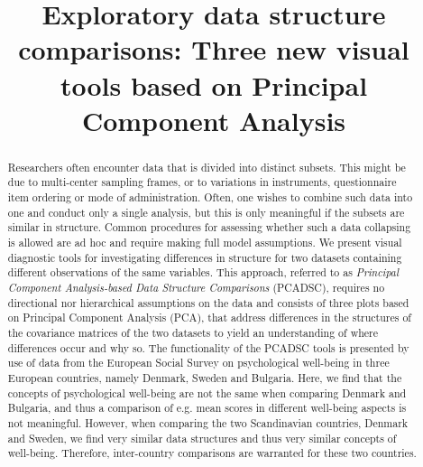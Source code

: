 \documentclass[a4paper,14pt]{article}
\begin{document}

\title{Exploratory data structure comparisons: Three new visual tools based on Principal Component Analysis}

\author[1]{}

\maketitle


\newpage

\renewcommand{\abstractname}{Abstract}
\renewcommand{\figurename}{Figure}
\renewcommand{\tablename}{Table}

\begin{abstract}
Researchers often encounter data that is divided into distinct subsets. This might be due to multi-center sampling frames, or to variations in instruments, questionnaire item ordering or mode of administration. Often, one wishes to combine such data into one and conduct only a single analysis, but this is only meaningful if the subsets are similar in structure. Common procedures for assessing whether such a data collapsing is allowed are ad hoc and require making full model assumptions. We present visual diagnostic tools for investigating differences in structure for two datasets containing different observations of the same variables. This approach, referred to as \textit{Principal Component Analysis-based Data Structure Comparisons} (PCADSC), requires no directional nor hierarchical assumptions on the data and consists of three plots based on Principal Component Analysis (PCA), that address differences in the structures of the covariance matrices of the two datasets to yield an  understanding of where differences occur and why so. The functionality of the PCADSC tools is presented by use of data from the European Social Survey on psychological well-being in three European countries, namely Denmark, Sweden and Bulgaria. Here, we find that the concepts of psychological well-being are not the same when comparing Denmark and Bulgaria, and thus a comparison of e.g. mean scores in different well-being aspects is not meaningful. However, when comparing the two Scandinavian countries, Denmark and Sweden, we find very similar data structures and thus very similar concepts of well-being. Therefore, inter-country comparisons are warranted for these two countries.
\end{abstract}
\end{document}
